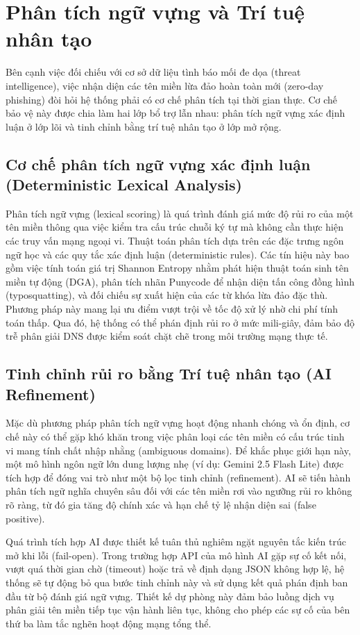 \section{Phân tích ngữ vựng và Trí tuệ nhân tạo}

Bên cạnh việc đối chiếu với cơ sở dữ liệu tình báo mối đe dọa (threat intelligence), việc nhận diện các tên miền lừa đảo hoàn toàn mới (zero-day phishing) đòi hỏi hệ thống phải có cơ chế phân tích tại thời gian thực. Cơ chế bảo vệ này được chia làm hai lớp bổ trợ lẫn nhau: phân tích ngữ vựng xác định luận ở lớp lõi và tinh chỉnh bằng trí tuệ nhân tạo ở lớp mở rộng.

\subsection{Cơ chế phân tích ngữ vựng xác định luận (Deterministic Lexical Analysis)}
Phân tích ngữ vựng (lexical scoring) là quá trình đánh giá mức độ rủi ro của một tên miền thông qua việc kiểm tra cấu trúc chuỗi ký tự mà không cần thực hiện các truy vấn mạng ngoại vi. Thuật toán phân tích dựa trên các đặc trưng ngôn ngữ học và các quy tắc xác định luận (deterministic rules). Các tín hiệu này bao gồm việc tính toán giá trị Shannon Entropy nhằm phát hiện thuật toán sinh tên miền tự động (DGA), phân tích nhãn Punycode để nhận diện tấn công đồng hình (typosquatting), và đối chiếu sự xuất hiện của các từ khóa lừa đảo đặc thù. Phương pháp này mang lại ưu điểm vượt trội về tốc độ xử lý nhờ chi phí tính toán thấp. Qua đó, hệ thống có thể phán định rủi ro ở mức mili-giây, đảm bảo độ trễ phân giải DNS được kiểm soát chặt chẽ trong môi trường mạng thực tế.

\subsection{Tinh chỉnh rủi ro bằng Trí tuệ nhân tạo (AI Refinement)}
Mặc dù phương pháp phân tích ngữ vựng hoạt động nhanh chóng và ổn định, cơ chế này có thể gặp khó khăn trong việc phân loại các tên miền có cấu trúc tinh vi mang tính chất nhập nhằng (ambiguous domains). Để khắc phục giới hạn này, một mô hình ngôn ngữ lớn dung lượng nhẹ (ví dụ: Gemini 2.5 Flash Lite) được tích hợp để đóng vai trò như một bộ lọc tinh chỉnh (refinement). AI sẽ tiến hành phân tích ngữ nghĩa chuyên sâu đối với các tên miền rơi vào ngưỡng rủi ro không rõ ràng, từ đó gia tăng độ chính xác và hạn chế tỷ lệ nhận diện sai (false positive). 

Quá trình tích hợp AI được thiết kế tuân thủ nghiêm ngặt nguyên tắc kiến trúc mở khi lỗi (fail-open). Trong trường hợp API của mô hình AI gặp sự cố kết nối, vượt quá thời gian chờ (timeout) hoặc trả về định dạng JSON không hợp lệ, hệ thống sẽ tự động bỏ qua bước tinh chỉnh này và sử dụng kết quả phán định ban đầu từ bộ đánh giá ngữ vựng. Thiết kế dự phòng này đảm bảo luồng dịch vụ phân giải tên miền tiếp tục vận hành liên tục, không cho phép các sự cố của bên thứ ba làm tắc nghẽn hoạt động mạng tổng thể.
